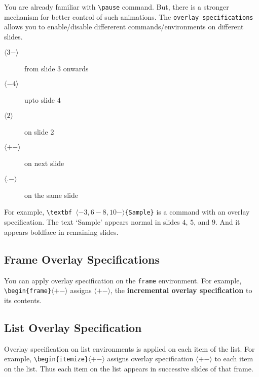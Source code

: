 \documentclass{article}
\begin{document}
	You are already familiar with \texttt{\textbackslash pause} command. But, there is a stronger mechanism for better control of such animations. The \texttt{overlay specifications} allows you to enable/disable differerent commands/environments on different slides.

\begin{description}
	\item[$\langle3-\rangle$] from slide 3 onwards
	\item[$\langle-4\rangle$] upto slide 4
	\item[$\langle2\rangle$] on slide 2
	\item[$\langle+-\rangle$] on next slide
	\item[$\langle.-\rangle$] on the same slide
\end{description}
For example, \texttt{\textbackslash textbf $\langle-3,6-8, 10-\rangle $\{Sample\}} is a command with an overlay specification. The text `Sample' appears normal in slides $4$, $5$, and $9$. And it appears boldface in remaining slides.

\subsection{Frame Overlay Specifications}
	You can apply overlay specification on the \texttt{frame} environment. For example, \texttt{\textbackslash begin\{frame\}$\langle+-\rangle$} assigns $\langle+-\rangle$, the \textbf{incremental overlay specification} to its contents.

\subsection{List Overlay Specification}
	Overlay specification on list environments is applied on each item of the list. For example, \texttt{\textbackslash begin\{itemize\}$\langle+-\rangle$} assigns overlay specification $\langle+-\rangle$ to each item on the list. Thus each item on the list appears in successive slides of that frame.
\end{document}
